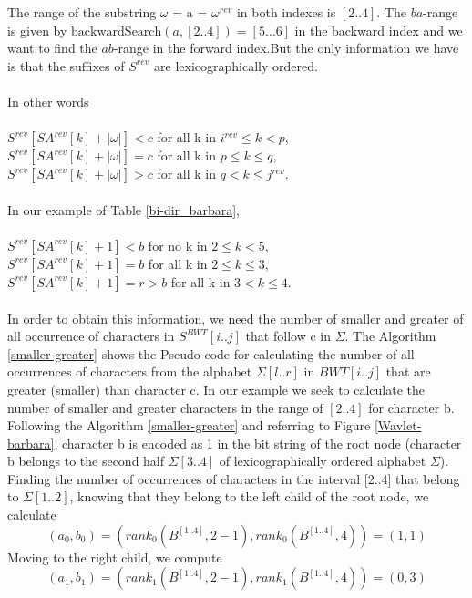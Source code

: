\documentclass[11pt,a4paper]{report}
\begin{document}
The range of the substring   
$\omega$ = a = $\omega^{rev}$ in both indexes is $[2..4]$.
The $ba$-range is given by $\mbox{backwardSearch}(a,[2..4])=[5\ldots 6]$
in the backward index and we want to find the $ab$-range in
the forward index.But the only information we have is that 
the suffixes of $S^{rev}$ are lexicographically ordered. \\\\
In other words \cite{bidirectional}\\\\
$S^{rev}[SA^{rev}[k]+|\omega|] < c$ for all k in $i^{rev}  \leq k  < p$,\\
$S^{rev}[SA^{rev}[k]+|\omega|] = c$ for all k in  $p  \leq  k  \leq  q $,\\
$S^{rev}[SA^{rev}[k]+|\omega|] > c$ for all k in  $q <   k \leq   j^{rev}$.\\\\
In our example of Table \ref{bi-dir_barbara},\\\\
$S^{rev}[SA^{rev}[k]+1] < b $ for no  k in $ 2 \leq k  < 5 $,\\
$S^{rev}[SA^{rev}[k]+1] = b $ for all k in $ 2  \leq  k  \leq  3 $,\\
$S^{rev}[SA^{rev}[k]+1] = r > b $ for all k in $ 3   < k  \leq  4 $.\\\\
In order to obtain this information, we need the number of smaller
and greater of all occurrence of characters in $S^{BWT}[i..j]$ 
that follow c in $\Sigma$. The Algorithm \ref{smaller-greater} 
shows  the Pseudo-code for calculating the number of all occurrences 
of characters from the alphabet $\Sigma[l..r]$ in $BWT[i..j]$ that 
are greater (smaller) than character c. In our example 
we seek to calculate the number of smaller and greater 
characters in the range of $[2..4]$ for character b.  
Following the Algorithm \ref{smaller-greater} \cite{bidirectional} 
and referring to Figure \ref{Wavlet-barbara}, character
b is encoded as 1 in the bit string of the root node (character b belongs 
to the second half $\Sigma[3..4]$ of lexicographically ordered 
alphabet $\Sigma$).
Finding the number of occurrences of characters 
in the interval [2..4] that belong to $\Sigma[1..2]$, knowing that 
they belong to the left child of the root node, we calculate\\
$$(a_{0}, b_{0})=(rank_{0} ( B^{[1..4]} ,  2-1), rank_{0} (B^{[1..4]} , 4)) = (1 , 1) $$
Moving to the right child, we compute
$$(a_{1}, b_{1})=(rank_{1} ( B^{[1..4]} ,  2-1), rank_{1} (B^{[1..4]} , 4)) = (0 , 3) $$
\end{document}
